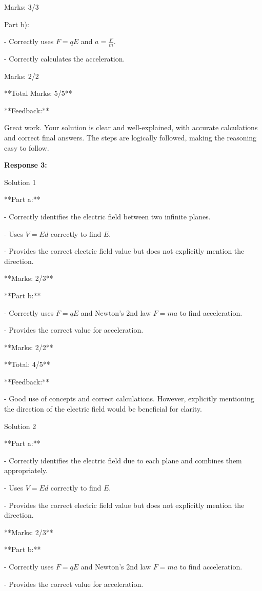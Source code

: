 \documentclass[a4paper,11pt]{article}
\begin{document}
Marks: 3/3

Part b):

- Correctly uses \( F = qE \) and \( a = \frac{F}{m} \).

- Correctly calculates the acceleration.

Marks: 2/2

**Total Marks: 5/5**

**Feedback:**

Great work. Your solution is clear and well-explained, with accurate calculations and correct final answers. The steps are logically followed, making the reasoning easy to follow.

\bigskip
\textbf{Response 3:}

Solution 1

**Part a:**

- Correctly identifies the electric field between two infinite planes.

- Uses \( V = Ed \) correctly to find \( E \).

- Provides the correct electric field value but does not explicitly mention the direction.

**Marks: 2/3**

**Part b:**

- Correctly uses \( F = qE \) and Newton’s 2nd law \( F = ma \) to find acceleration.

- Provides the correct value for acceleration.

**Marks: 2/2**

**Total: 4/5**

**Feedback:**

- Good use of concepts and correct calculations. However, explicitly mentioning the direction of the electric field would be beneficial for clarity.

Solution 2

**Part a:**

- Correctly identifies the electric field due to each plane and combines them appropriately.

- Uses \( V = Ed \) correctly to find \( E \).

- Provides the correct electric field value but does not explicitly mention the direction.

**Marks: 2/3**

**Part b:**

- Correctly uses \( F = qE \) and Newton’s 2nd law \( F = ma \) to find acceleration.

- Provides the correct value for acceleration.
\end{document}
